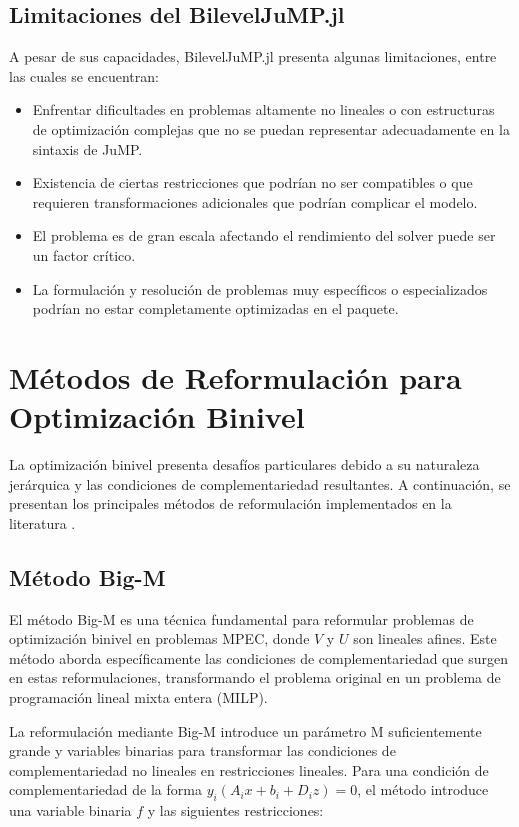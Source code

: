 \subsection{Limitaciones del BilevelJuMP.jl}

A pesar de sus capacidades, BilevelJuMP.jl presenta algunas limitaciones, entre las cuales se encuentran:

\begin{itemize}
    \item Enfrentar dificultades en problemas altamente no lineales o con estructuras de optimización complejas que no se puedan representar adecuadamente en la sintaxis de JuMP.
    \item Existencia de ciertas restricciones que podrían no ser compatibles o que requieren transformaciones adicionales que podrían complicar el modelo.
    \item El problema es de gran escala afectando el rendimiento del solver puede ser un factor crítico.
    \item La formulación y resolución de problemas muy específicos o especializados podrían no estar completamente optimizadas en el paquete.
\end{itemize}


\section{Métodos de Reformulación para Optimización Binivel}

La optimización binivel presenta desafíos particulares debido a su naturaleza jerárquica y las condiciones de complementariedad resultantes. A continuación, se presentan los principales métodos de reformulación implementados en la literatura \cite{BilevelJump}.

\subsection{Método Big-M}

El método Big-M es una técnica fundamental para reformular problemas de optimización binivel en problemas MPEC, donde $V$ y $U$ son lineales afines. Este método aborda específicamente las condiciones de complementariedad que surgen en estas reformulaciones, transformando el problema original en un problema de programación lineal mixta entera (MILP).

La reformulación mediante Big-M introduce un parámetro M suficientemente grande y variables binarias para transformar las condiciones de complementariedad no lineales en restricciones lineales. Para una condición de complementariedad de la forma $y_i(A_ix + b_i + D_iz) = 0$, el método introduce una variable binaria $f$ y las siguientes restricciones:

